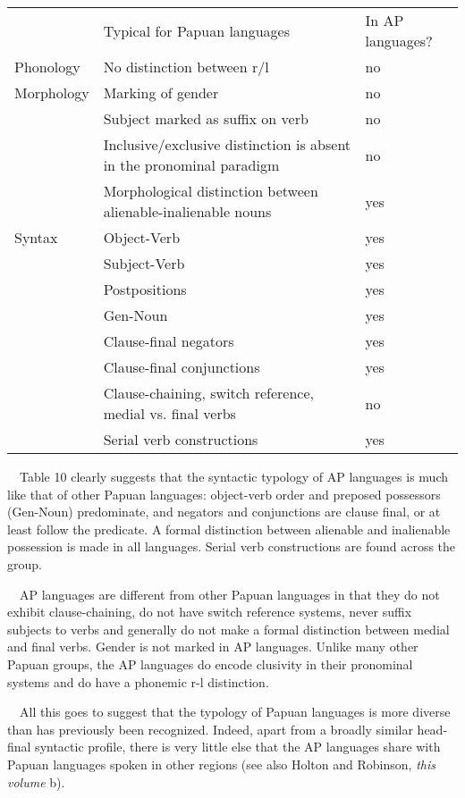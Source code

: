 \begin{flushleft}
\tablehead{}
\begin{supertabular}{m{0.9038598in}m{4.01636in}m{1.4156599in}}
 &
Typical for Papuan languages &
In AP languages?\\
Phonology &
No distinction between r/l &
no \\
Morphology &
Marking of gender &
no\\
 &
Subject marked as suffix on verb &
no\\
 &
Inclusive/exclusive distinction is absent in the pronominal paradigm &
no\\
 &
Morphological distinction between alienable-inalienable nouns  &
yes\\
Syntax &
Object-Verb &
yes\\
 &
Subject-Verb &
yes\\
 &
Postpositions &
yes\\
 &
Gen-Noun  &
yes\\
 &
Clause-final negators &
yes\\
 &
Clause-final conjunctions  &
yes\\
 &
Clause-chaining, switch reference, medial vs.  final verbs &
no \\
 &
Serial verb constructions &
yes\\
\end{supertabular}
\end{flushleft}
\ \ Table 10 clearly suggests that the syntactic typology of AP languages is much like that of other Papuan languages: object-verb order and preposed possessors (Gen-Noun) predominate, and negators and conjunctions are clause final, or at least follow the predicate. A formal distinction between alienable and inalienable possession is made in all languages. Serial verb constructions are found across the group. 

\ \ AP languages are different from other Papuan languages in that they do not exhibit clause-chaining, do not have switch reference systems, never suffix subjects to verbs and generally do not make a formal distinction between medial and final verbs. Gender is not marked in AP languages. Unlike many other Papuan groups, the AP languages do encode clusivity in their pronominal systems and do have a phonemic r-l distinction. 

\ \ All this goes to suggest that the typology of Papuan languages is more diverse than has previously been recognized. Indeed, apart from a broadly similar head-final syntactic profile, there is very little else that the AP languages share with Papuan languages spoken in other regions (see also Holton and Robinson, \textit{this volume} b).  

